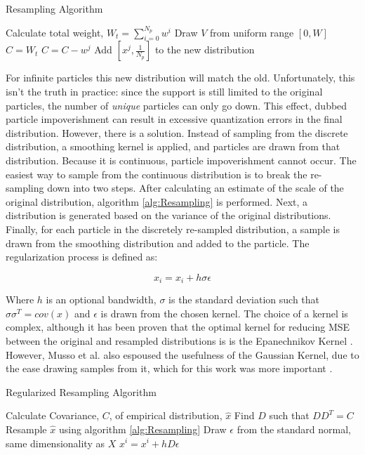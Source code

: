 \begin{algorithm}
\caption{Resampling Algorithm}
\begin{algorithmic}
\STATE Calculate total weight, $W_t = \sum_{i=0}^{N_p} w^i$
    \STATE Draw $V$ from uniform range $[0, W]$
    \STATE $C = W_t$
        \STATE $C = C - w^j$
    \ENDFOR
    \STATE Add $[x^j, \frac{1}{N_p}]$ to the new distribution
\ENDFOR
\STATE 
\end{algorithmic}
\label{alg:Resampling}
\end{algorithm}
For infinite particles this new distribution will match the old.
Unfortunately, this isn't the truth in practice: since the support is
still limited to the original particles, the number of \emph{unique} particles can only go down.
This effect, dubbed particle impoverishment can result in excessive quantization
errors in the final distribution. However, there is a solution. Instead of sampling from the
discrete distribution, a smoothing kernel is applied, and particles are drawn from
that distribution. Because it is continuous, particle impoverishment
cannot occur. The easiest way to sample from the continuous distribution is to break the 
re-sampling down into two steps. After calculating an estimate of the scale of the original
distribution, algorithm \autoref{alg:Resampling} is performed. Next, a distribution is generated
based on the variance of the original distributions.
Finally, for each particle in the discretely re-sampled distribution, a sample is drawn from 
the smoothing 
distribution and added to the particle.  The regularization process is defined as:

\begin{equation}
x_i = x_i + h\sigma \epsilon
\end{equation}

Where $h$ is an optional bandwidth, $\sigma$ is the standard deviation such that 
$\sigma \sigma^T = cov(x)$
and $\epsilon$ is drawn from the chosen kernel. The choice of a kernel is
complex, although it has been proven that the optimal kernel for reducing \ac{MSE} between
the original and resampled distributions is 
is the Epanechnikov Kernel \cite{Musso2001a}. However, Musso et al. 
also espoused the usefulness of the Gaussian Kernel, due to the ease
drawing samples from it, which for this work was more important \cite{Musso2001a}.

\begin{algorithm}
\caption{Regularized Resampling Algorithm}
\begin{algorithmic}
\STATE Calculate Covariance, $C$, of empirical distribution, $\hat{x}$
\STATE Find $D$ such that $DD^T = C$
\STATE Resample $\hat{x}$ using algorithm \autoref{alg:Resampling}
    \STATE Draw $\epsilon$ from the standard normal, same dimensionality as $X$
    \STATE $x^i = x^i + hD\epsilon$
\ENDFOR
\end{algorithmic}
\label{alg:RegResampling}
\end{algorithm}

